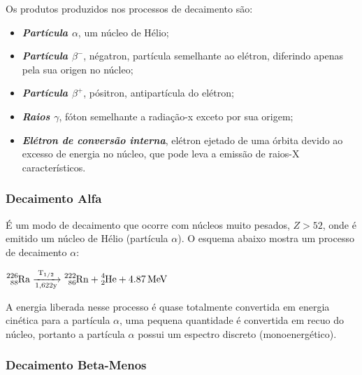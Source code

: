 \documentclass[11pt,a4paper]{article}
\begin{document}
            Os produtos produzidos nos processos de decaimento são:

            \begin{itemize}
                \item \textbf{\textit{\textcolor{CarnationPink}{Partícula $\alpha$}}}, um núcleo de Hélio;
                \item \textbf{\textit{\textcolor{CarnationPink}{Partícula $\beta^-$}}}, négatron, partícula semelhante ao elétron, diferindo apenas pela sua origen no núcleo;
                \item \textbf{\textit{\textcolor{CarnationPink}{Partícula $\beta^+$}}}, pósitron, antipartícula do elétron;
                \item \textbf{\textit{\textcolor{CarnationPink}{Raios $\gamma$}}}, fóton semelhante a radiação-x exceto por sua origem;
                \item \textbf{\textit{\textcolor{CarnationPink}{Elétron de conversão interna}}}, elétron ejetado de uma órbita devido ao excesso de energia no núcleo, que pode leva a emissão de raios-X característicos.
            \end{itemize}
        
            \subsubsection{Decaimento Alfa}

                É um modo de decaimento que ocorre com núcleos muito pesados, $Z > 52$, onde é emitido um núcleo de Hélio (partícula $\alpha$). O esquema abaixo mostra um processo de decaimento $\alpha$:

                \begin{center}
                    $\ce{^{226}_{88}Ra ->[{T_{1/2}}][{1,622y}] ^{222}_{86}Rn + ^{4}_{2}He + 4.87 MeV}$
                \end{center}

                A energia liberada nesse processo é quase totalmente convertida em energia cinética para a partícula $\alpha$, uma pequena quantidade é convertida em recuo do núcleo, portanto a partícula $\alpha$ possui um espectro discreto (monoenergético). 
            

            \subsubsection{Decaimento Beta-Menos}
                
\end{document}
